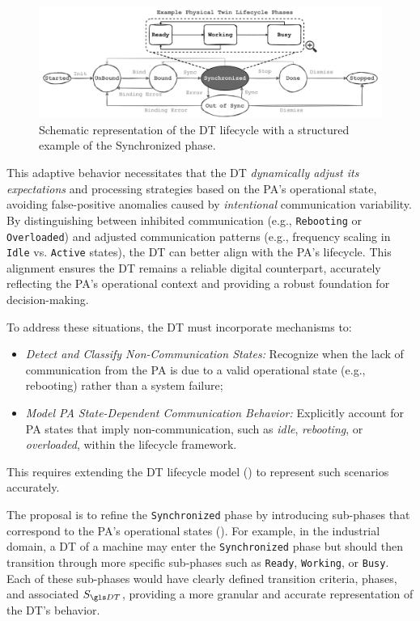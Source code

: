 \begin{figure}
    \centering
    \includegraphics[width=\textwidth]{figures/dt-lifecycle/dt_lifecycle_pt_sync.pdf}
    \caption{Schematic representation of the \ac{DT} lifecycle with a structured example of the Synchronized phase.}
    \label{fig:dt_lifecycle_pt_sync}
\end{figure}


This adaptive behavior necessitates that the \ac{DT} \emph{dynamically adjust its expectations} and processing strategies based on the \ac{PA}'s operational state, avoiding false-positive anomalies caused by \emph{intentional} communication variability.  
By distinguishing between inhibited communication (e.g., \texttt{Rebooting} or \texttt{Overloaded}) and adjusted communication patterns (e.g., frequency scaling in \texttt{Idle} vs. \texttt{Active} states), the \ac{DT} can better align with the \ac{PA}'s lifecycle.
This alignment ensures the \ac{DT} remains a reliable digital counterpart, accurately reflecting the \ac{PA}'s operational context and providing a robust foundation for decision-making.  

To address these situations, the \ac{DT} must incorporate mechanisms to: 
\begin{itemize}
    \item \emph{Detect and Classify Non-Communication States:} Recognize when the lack of communication from the \ac{PA} is due to a valid operational state (e.g., rebooting) rather than a system failure;
    \item \emph{Model \ac{PA} State-Dependent Communication Behavior:} Explicitly account for \ac{PA} states that imply non-communication, such as \textit{idle}, \textit{rebooting}, or \textit{overloaded}, within the lifecycle framework. 
\end{itemize}
This requires extending the \ac{DT} lifecycle model () to represent such scenarios accurately.


The proposal is to refine the \texttt{Synchronized} phase by introducing sub-phases that correspond to the \ac{PA}'s operational states ().
For example, in the industrial domain, a \ac{DT} of a machine may enter the \texttt{Synchronized} phase but should then transition through more specific sub-phases such as \texttt{Ready}, \texttt{Working}, or \texttt{Busy}.
Each of these sub-phases would have clearly defined transition criteria, phases, and associated $S_{\ac{DT}}$, providing a more granular and accurate representation of the \ac{DT}'s behavior.

